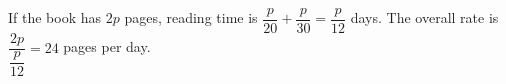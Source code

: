 If the book has $2p$ pages, reading time is $\dfrac{p}{20}+\dfrac{p}{30}=\dfrac{p}{12}$ days. The overall rate is $\dfrac{2p}{\dfrac{p}{12}}=\boxed{24}$ pages per day.
